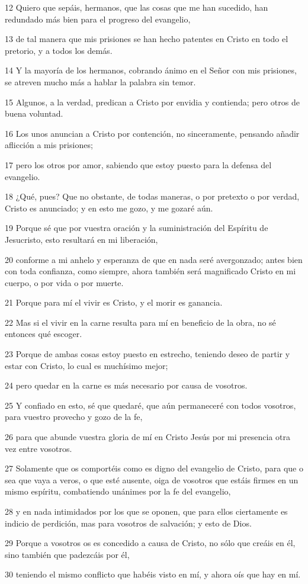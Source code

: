 \par 12 Quiero que sepáis, hermanos, que las cosas que me han sucedido, han redundado más bien para el progreso del evangelio,
\par 13 de tal manera que mis prisiones se han hecho patentes en Cristo en todo el pretorio, y a todos los demás.
\par 14 Y la mayoría de los hermanos, cobrando ánimo en el Señor con mis prisiones, se atreven mucho más a hablar la palabra sin temor.
\par 15 Algunos, a la verdad, predican a Cristo por envidia y contienda; pero otros de buena voluntad.
\par 16 Los unos anuncian a Cristo por contención, no sinceramente, pensando añadir aflicción a mis prisiones;
\par 17 pero los otros por amor, sabiendo que estoy puesto para la defensa del evangelio.
\par 18 ¿Qué, pues? Que no obstante, de todas maneras, o por pretexto o por verdad, Cristo es anunciado; y en esto me gozo, y me gozaré aún.
\par 19 Porque sé que por vuestra oración y la suministración del Espíritu de Jesucristo, esto resultará en mi liberación,
\par 20 conforme a mi anhelo y esperanza de que en nada seré avergonzado; antes bien con toda confianza, como siempre, ahora también será magnificado Cristo en mi cuerpo, o por vida o por muerte.
\par 21 Porque para mí el vivir es Cristo, y el morir es ganancia.
\par 22 Mas si el vivir en la carne resulta para mí en beneficio de la obra, no sé entonces qué escoger.
\par 23 Porque de ambas cosas estoy puesto en estrecho, teniendo deseo de partir y estar con Cristo, lo cual es muchísimo mejor;
\par 24 pero quedar en la carne es más necesario por causa de vosotros.
\par 25 Y confiado en esto, sé que quedaré, que aún permaneceré con todos vosotros, para vuestro provecho y gozo de la fe,
\par 26 para que abunde vuestra gloria de mí en Cristo Jesús por mi presencia otra vez entre vosotros.
\par 27 Solamente que os comportéis como es digno del evangelio de Cristo, para que o sea que vaya a veros, o que esté ausente, oiga de vosotros que estáis firmes en un mismo espíritu, combatiendo unánimes por la fe del evangelio,
\par 28 y en nada intimidados por los que se oponen, que para ellos ciertamente es indicio de perdición, mas para vosotros de salvación; y esto de Dios.
\par 29 Porque a vosotros os es concedido a causa de Cristo, no sólo que creáis en él, sino también que padezcáis por él,
\par 30 teniendo el mismo conflicto que habéis visto en mí, y ahora oís que hay en mí.

